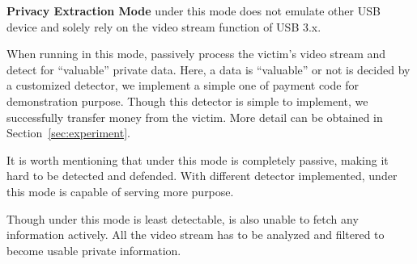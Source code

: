 \textbf{Privacy Extraction Mode}
\tool under this mode does not emulate other USB device and solely rely on the video stream function of USB 3.x.

When running in this mode, \tool passively process the victim's video stream and detect for ``valuable'' private data.  Here, a data is ``valuable'' or not is decided by a customized detector, we implement a simple one of payment code for demonstration purpose. Though this detector is simple to implement, we successfully transfer money from the victim. More detail can be obtained in Section~\ref{sec:experiment}.

It is worth mentioning that \tool under this mode is completely passive, making it hard to be detected and defended. With different detector implemented, \tool under this mode is capable of serving more purpose.

Though \tool under this mode is least detectable, \tool is also unable to fetch any information actively. All the video stream has to be analyzed and filtered to become usable private information.
